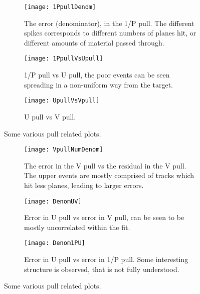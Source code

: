 \begin{figure}
    \centering
    \begin{subfigure}[]{0.6\textwidth}
        \centering
        \texttt{[image: 1PpullDenom]} 
        \caption{The error (denominator), in the 1/P pull. The different spikes corresponds to different numbers of planes hit, or different amounts of material passed through.}
    \end{subfigure}

    \begin{subfigure}[]{0.6\textwidth}
        \centering
        \texttt{[image: 1PpullVsUpull]} 
        \caption{1/P pull vs U pull, the poor events can be seen spreading in a non-uniform way from the target.}
    \end{subfigure}
    
    \begin{subfigure}[]{0.6\textwidth}
        \centering
        \texttt{[image: UpullVsVpull]} 
        \caption{U pull vs V pull.}
    \end{subfigure}

    \caption{Some various pull related plots.}
\end{figure}


\begin{figure}
    \centering
    \begin{subfigure}[]{0.6\textwidth}
        \centering
        \texttt{[image: VpullNumDenom]} 
        \caption{The error in the V pull vs the residual in the V pull. The upper events are mostly comprised of tracks which hit less planes, leading to larger errors.}
    \end{subfigure}

    \begin{subfigure}[]{0.6\textwidth}
        \centering
        \texttt{[image: DenomUV]} 
        \caption{Error in U pull vs error in V pull, can be seen to be mostly uncorrelated within the fit.}
    \end{subfigure}
    
    \begin{subfigure}[]{0.6\textwidth}
        \centering
        \texttt{[image: Denom1PU]} 
        \caption{Error in U pull vs error in 1/P pull. Some interesting structure is observed, that is not fully understood.}
    \end{subfigure}

    \caption{Some various pull related plots.}
\end{figure}



